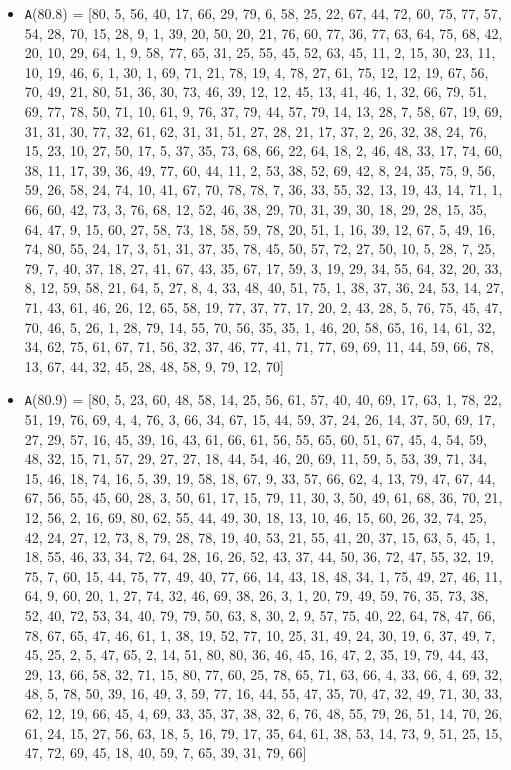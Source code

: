 \documentclass[runningheads, a4paper]{llncs}
\begin{document}
\begin{itemize}
	\item {\texttt A(80.8) = } [80, 5, 56, 40, 17, 66, 29, 79, 6, 58, 25, 22, 67, 44, 72, 60, 75, 77, 57, 54, 28, 70, 15, 28, 9, 1, 39, 20, 50, 20, 21, 76, 60, 77, 36, 77, 63, 64, 75, 68, 42, 20, 10, 29, 64, 1, 9, 58, 77, 65, 31, 25, 55, 45, 52, 63, 45, 11, 2, 15, 30, 23, 11, 10, 19, 46, 6, 1, 30, 1, 69, 71, 21, 78, 19, 4, 78, 27, 61, 75, 12, 12, 19, 67, 56, 70, 49, 21, 80, 51, 36, 30, 73, 46, 39, 12, 12, 45, 13, 41, 46, 1, 32, 66, 79, 51, 69, 77, 78, 50, 71, 10, 61, 9, 76, 37, 79, 44, 57, 79, 14, 13, 28, 7, 58, 67, 19, 69, 31, 31, 30, 77, 32, 61, 62, 31, 31, 51, 27, 28, 21, 17, 37, 2, 26, 32, 38, 24, 76, 15, 23, 10, 27, 50, 17, 5, 37, 35, 73, 68, 66, 22, 64, 18, 2, 46, 48, 33, 17, 74, 60, 38, 11, 17, 39, 36, 49, 77, 60, 44, 11, 2, 53, 38, 52, 69, 42, 8, 24, 35, 75, 9, 56, 59, 26, 58, 24, 74, 10, 41, 67, 70, 78, 78, 7, 36, 33, 55, 32, 13, 19, 43, 14, 71, 1, 66, 60, 42, 73, 3, 76, 68, 12, 52, 46, 38, 29, 70, 31, 39, 30, 18, 29, 28, 15, 35, 64, 47, 9, 15, 60, 27, 58, 73, 18, 58, 59, 78, 20, 51, 1, 16, 39, 12, 67, 5, 49, 16, 74, 80, 55, 24, 17, 3, 51, 31, 37, 35, 78, 45, 50, 57, 72, 27, 50, 10, 5, 28, 7, 25, 79, 7, 40, 37, 18, 27, 41, 67, 43, 35, 67, 17, 59, 3, 19, 29, 34, 55, 64, 32, 20, 33, 8, 12, 59, 58, 21, 64, 5, 27, 8, 4, 33, 48, 40, 51, 75, 1, 38, 37, 36, 24, 53, 14, 27, 71, 43, 61, 46, 26, 12, 65, 58, 19, 77, 37, 77, 17, 20, 2, 43, 28, 5, 76, 75, 45, 47, 70, 46, 5, 26, 1, 28, 79, 14, 55, 70, 56, 35, 35, 1, 46, 20, 58, 65, 16, 14, 61, 32, 34, 62, 75, 61, 67, 71, 56, 32, 37, 46, 77, 41, 71, 77, 69, 69, 11, 44, 59, 66, 78, 13, 67, 44, 32, 45, 28, 48, 58, 9, 79, 12, 70]
	\item {\texttt A(80.9) = } [80, 5, 23, 60, 48, 58, 14, 25, 56, 61, 57, 40, 40, 69, 17, 63, 1, 78, 22, 51, 19, 76, 69, 4, 4, 76, 3, 66, 34, 67, 15, 44, 59, 37, 24, 26, 14, 37, 50, 69, 17, 27, 29, 57, 16, 45, 39, 16, 43, 61, 66, 61, 56, 55, 65, 60, 51, 67, 45, 4, 54, 59, 48, 32, 15, 71, 57, 29, 27, 27, 18, 44, 54, 46, 20, 69, 11, 59, 5, 53, 39, 71, 34, 15, 46, 18, 74, 16, 5, 39, 19, 58, 18, 67, 9, 33, 57, 66, 62, 4, 13, 79, 47, 67, 44, 67, 56, 55, 45, 60, 28, 3, 50, 61, 17, 15, 79, 11, 30, 3, 50, 49, 61, 68, 36, 70, 21, 12, 56, 2, 16, 69, 80, 62, 55, 44, 49, 30, 18, 13, 10, 46, 15, 60, 26, 32, 74, 25, 42, 24, 27, 12, 73, 8, 79, 28, 78, 19, 40, 53, 21, 55, 41, 20, 37, 15, 63, 5, 45, 1, 18, 55, 46, 33, 34, 72, 64, 28, 16, 26, 52, 43, 37, 44, 50, 36, 72, 47, 55, 32, 19, 75, 7, 60, 15, 44, 75, 77, 49, 40, 77, 66, 14, 43, 18, 48, 34, 1, 75, 49, 27, 46, 11, 64, 9, 60, 20, 1, 27, 74, 32, 46, 69, 38, 26,  3, 1, 20, 79, 49, 59, 76, 35, 73, 38, 52, 40, 72, 53, 34, 40, 79, 79, 50, 63, 8, 30, 2, 9, 57, 75, 40, 22, 64, 78, 47, 66, 78, 67, 65, 47, 46, 61, 1, 38, 19, 52, 77, 10, 25, 31, 49, 24, 30, 19, 6, 37, 49, 7, 45, 25, 2, 5, 47, 65, 2, 14, 51, 80, 80, 36, 46, 45, 16, 47, 2, 35, 19, 79, 44, 43, 29, 13, 66, 58, 32, 71, 15, 80, 77, 60, 25, 78, 65, 71, 63, 66, 4, 33, 66, 4, 69, 32, 48, 5, 78, 50, 39, 16, 49, 3, 59, 77, 16, 44, 55, 47, 35, 70, 47, 32, 49, 71, 30, 33, 62, 12, 19, 66, 45, 4, 69, 33, 35, 37, 38, 32, 6, 76, 48, 55, 79, 26, 51, 14, 70, 26, 61, 24, 15, 27, 56, 63, 18, 5, 16, 79, 17, 35, 64, 61, 38, 53, 14, 73, 9, 51, 25, 15, 47, 72, 69, 45, 18, 40, 59, 7, 65, 39, 31, 79, 66] 

\end{itemize}
\end{document}
